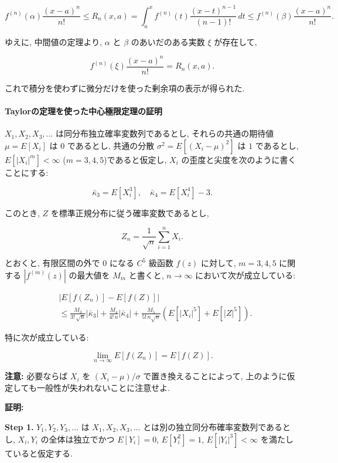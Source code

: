 \documentclass[
  letterpaper,
  DIV=11,
  numbers=noendperiod]{scrartcl}
\let\oldparagraph\paragraph
\renewcommand{\paragraph}[1]{\oldparagraph{#1}\mbox{}}
\begin{document}
\[
f^{(n)}(\alpha)\frac{(x-a)^n}{n!} \le
R_n(x,a) = \int_a^x f^{(n)}(t)\frac{(x-t)^{n-1}}{(n-1)!}\,dt
\le f^{(n)}(\beta)\frac{(x-a)^n}{n!}.
\]

ゆえに, 中間値の定理より, \(\alpha\) と \(\beta\) のあいだのある実数
\(\xi\) が存在して,

\[
f^{(n)}(\xi)\frac{(x-a)^n}{n!} = R_n(x, a).
\]

これで積分を使わずに微分だけを使った剰余項の表示が得られた.

\hypertarget{taylorux306eux5b9aux7406ux3092ux4f7fux3063ux305fux4e2dux5fc3ux6975ux9650ux5b9aux7406ux306eux8a3cux660e}{%
\paragraph{Taylorの定理を使った中心極限定理の証明}\label{taylorux306eux5b9aux7406ux3092ux4f7fux3063ux305fux4e2dux5fc3ux6975ux9650ux5b9aux7406ux306eux8a3cux660e}}

\(X_1,X_2,X_3,\ldots\) は同分布独立確率変数列であるとし,
それらの共通の期待値 \(\mu=E[X_i]\) は \(0\) であるとし, 共通の分散
\(\sigma^2=E[(X_i-\mu)^2]\) は \(1\) であるとし, \(E[|X_i|^m]<\infty\)
(\(m=3,4,5\))であると仮定し, \(X_i\)
の歪度と尖度を次のように書くことにする:

\[
\bar\kappa_3 = E[X_i^3], \quad \bar\kappa_4 = E[X_i^4] - 3.
\]

このとき, \(Z\) を標準正規分布に従う確率変数であるとし,

\[
Z_n = \frac{1}{\sqrt{n}} \sum_{i=1}^n X_i.
\]

とおくと, 有限区間の外で \(0\) になる \(C^5\) 級函数 \(f(z)\) に対して,
\(m=3,4,5\) に関する \(|f^{(m)}(z)|\) の最大値を \(M_m\) と書くと,
\(n\to\infty\) において次が成立している:

\[
\begin{aligned}
&
|E[f(Z_n)] - E[f(Z)]|
\\ &\le
\frac{M_3}{3!\,\sqrt{n}}|\bar\kappa_3| +
\frac{M_4}{4!\,n}|\bar\kappa_4| +
\frac{M_5}{5!\,n\sqrt{n}}(E[|X_i|^5] + E[|Z|^5]).
\end{aligned}
\]

特に次が成立している:

\[
\lim_{n\to\infty} E[f(Z_n)] = E[f(Z)].
\]

\textbf{注意:} 必要ならば \(X_i\) を \((X_i-\mu)/\sigma\)
で置き換えることによって,
上のように仮定しても一般性が失われないことに注意せよ.

\textbf{証明:}

\textbf{Step 1.} \(Y_1,Y_2,Y_3,\ldots\) は \(X_1,X_2,X_3,\ldots\)
とは別の独立同分布確率変数列であるとし, \(X_i,Y_i\) の全体は独立でかつ
\(E[Y_i]=0\), \(E[Y_i^2]=1\), \(E[|Y_i|^3]<\infty\)
を満たしていると仮定する.
\end{document}

